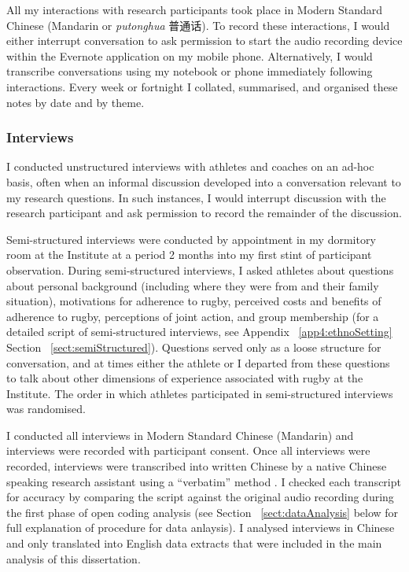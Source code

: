 \begin{CJK}{UTF8}{gbsn}
All my interactions with research participants took place in Modern Standard Chinese (Mandarin or \textit{putonghua} 普通话).  To record these interactions, I would either interrupt conversation to ask permission to start the audio recording device within the Evernote application on my mobile phone.  Alternatively, I would transcribe conversations using my notebook or phone immediately following interactions.  Every week or fortnight I collated, summarised, and organised these notes by date and by theme.


  \subsubsection{Interviews}
I conducted unstructured interviews with athletes and coaches on an ad-hoc basis, often when an informal discussion developed into a conversation relevant to my research questions.  In such instances, I would interrupt discussion with the research participant and ask permission to record the remainder of the discussion.

Semi-structured interviews were conducted by appointment in my dormitory room at the Institute at a period 2 months into my first stint of participant observation.  During semi-structured interviews, I asked athletes about questions about personal background (including where they were from and their family situation), motivations for adherence to rugby, perceived costs and benefits of adherence to rugby, perceptions of joint action, and group membership (for a detailed script of semi-structured interviews, see Appendix ~\ref{app4:ethnoSetting} Section ~\ref{sect:semiStructured}).  Questions served only as a loose structure for conversation, and at times either the athlete or I departed from these questions to talk about other dimensions of experience associated with rugby at the Institute.  The order in which athletes participated in semi-structured interviews was randomised.

I conducted all interviews in Modern Standard Chinese (Mandarin) and interviews were recorded with participant consent.  Once all interviews were recorded, interviews were transcribed into written Chinese by a native Chinese speaking research assistant using a ``verbatim'' method \citep[i.e., including an account of all verbal and important nonverbal (coughs, pauses, etc.) utterances, see][269-70]{Poland2003}.  I checked each transcript for accuracy by comparing the script against the original audio recording during the first phase of open coding analysis (see Section ~\ref{sect:dataAnalysis} below for full explanation of procedure for data anlaysis).  I analysed interviews in Chinese and only translated into English data extracts that were included in the main analysis of this dissertation.


\end{CJK}
